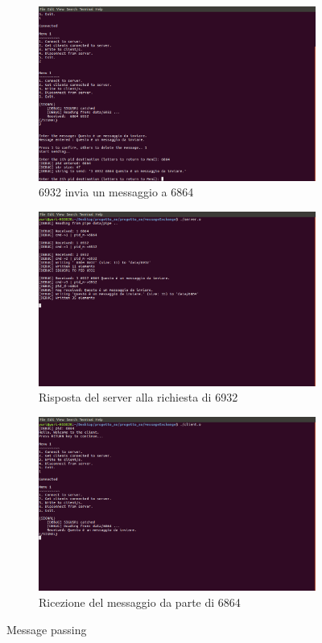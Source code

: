 \documentclass[a4paper]{article}
\begin{document}
\begin{figure}
\centering
\begin{subfigure}[b]{0.7\textwidth}
\includegraphics[width=\textwidth]{screenmsg/8_client_6932}
\caption{6932 invia un messaggio a 6864}
\end{subfigure}
\begin{subfigure}[b]{0.7\textwidth}
\includegraphics[width=\textwidth]{screenmsg/9_server}
\caption{Risposta del server alla richiesta di 6932}
\end{subfigure}
\begin{subfigure}[b]{0.7\textwidth}
\includegraphics[width=\textwidth]{screenmsg/10_client_6864}
\caption{Ricezione del messaggio da parte di 6864}
\end{subfigure}
\caption{Message passing}
\end{figure}
\end{document}
